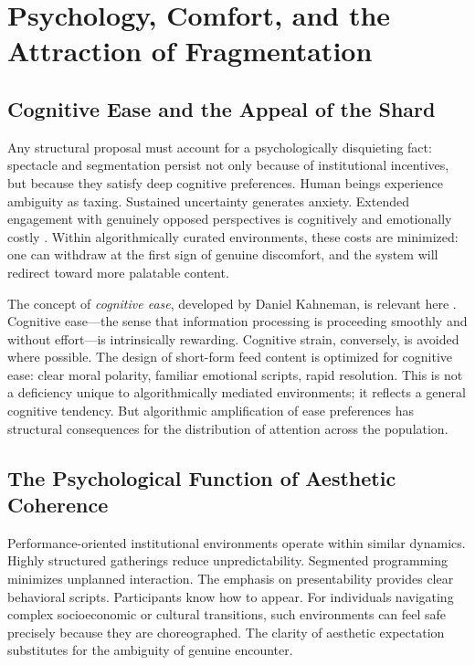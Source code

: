 \documentclass[12pt]{article}
\begin{document}
\section{Psychology, Comfort, and the Attraction of Fragmentation}
\label{sec:psychology}

\subsection{Cognitive Ease and the Appeal of the Shard}

Any structural proposal must account for a psychologically disquieting fact: spectacle and segmentation persist not only because of institutional incentives, but because they satisfy deep cognitive preferences. Human beings experience ambiguity as taxing. Sustained uncertainty generates anxiety. Extended engagement with genuinely opposed perspectives is cognitively and emotionally costly \citep{Kahneman2011}. Within algorithmically curated environments, these costs are minimized: one can withdraw at the first sign of genuine discomfort, and the system will redirect toward more palatable content.

The concept of \emph{cognitive ease}, developed by Daniel Kahneman, is relevant here \citep{Kahneman2011}. Cognitive ease---the sense that information processing is proceeding smoothly and without effort---is intrinsically rewarding. Cognitive strain, conversely, is avoided where possible. The design of short-form feed content is optimized for cognitive ease: clear moral polarity, familiar emotional scripts, rapid resolution. This is not a deficiency unique to algorithmically mediated environments; it reflects a general cognitive tendency. But algorithmic amplification of ease preferences has structural consequences for the distribution of attention across the population.

\subsection{The Psychological Function of Aesthetic Coherence}

Performance-oriented institutional environments operate within similar dynamics. Highly structured gatherings reduce unpredictability. Segmented programming minimizes unplanned interaction. The emphasis on presentability provides clear behavioral scripts. Participants know how to appear. For individuals navigating complex socioeconomic or cultural transitions, such environments can feel safe precisely because they are choreographed. The clarity of aesthetic expectation substitutes for the ambiguity of genuine encounter.
\end{document}
